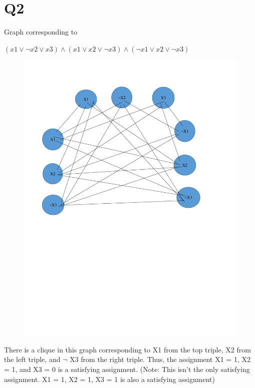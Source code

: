 \documentclass[11pt,a4paper]{article}
\begin{document}
\newpage
\section*{Q2}

Graph corresponding to 

$(x1 \lor \neg x2 \lor x3) \land (x1 \lor x2 \lor \neg x3) \land (\neg x1 \lor x2 \lor \neg x3)$
\begin{figure}
	\centering
	\includegraphics[scale=.80]{clique.pdf}
\end{figure}

There is a clique in this graph corresponding to X1 from the top triple, X2 from the left triple, and $\neg$ X3 from the right triple. Thus, the assignment X1 = 1, X2 = 1, and X3 = 0 is a satisfying assignment. (Note: This isn't the only satisfying assignment. X1 = 1, X2 = 1, X3 = 1 is also a satisfying assignment)
\end{document}
